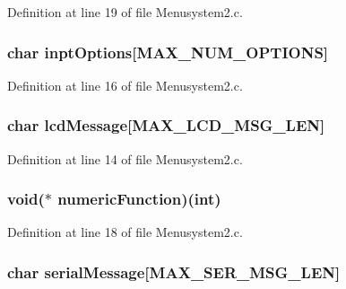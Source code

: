 Definition at line 19 of file Menusystem2.\+c.

\hypertarget{struct_sub_menu_aef0980fb751ef312c4ff945539aa3cd4}{
\subsubsection[{inpt\+Options}]{\setlength{\rightskip}{0pt plus 5cm}char inpt\+Options\mbox{[}{\bf M\+A\+X\+\_\+\+N\+U\+M\+\_\+\+O\+P\+T\+I\+O\+N\+S}\mbox{]}}}\label{struct_sub_menu_aef0980fb751ef312c4ff945539aa3cd4}


Definition at line 16 of file Menusystem2.\+c.

\hypertarget{struct_sub_menu_a10ce8be3d2bbadbc9c262b6be4bb3aec}{
\subsubsection[{lcd\+Message}]{\setlength{\rightskip}{0pt plus 5cm}char lcd\+Message\mbox{[}{\bf M\+A\+X\+\_\+\+L\+C\+D\+\_\+\+M\+S\+G\+\_\+\+L\+E\+N}\mbox{]}}}\label{struct_sub_menu_a10ce8be3d2bbadbc9c262b6be4bb3aec}


Definition at line 14 of file Menusystem2.\+c.

\hypertarget{struct_sub_menu_a1dae2f8dad8e2d2a30b13ee69ea542db}{
\subsubsection[{numeric\+Function}]{\setlength{\rightskip}{0pt plus 5cm}void($\ast$ numeric\+Function)(int)}}\label{struct_sub_menu_a1dae2f8dad8e2d2a30b13ee69ea542db}


Definition at line 18 of file Menusystem2.\+c.

\hypertarget{struct_sub_menu_a24706f7b55951b0e21967a256e107936}{
\subsubsection[{serial\+Message}]{\setlength{\rightskip}{0pt plus 5cm}char serial\+Message\mbox{[}{\bf M\+A\+X\+\_\+\+S\+E\+R\+\_\+\+M\+S\+G\+\_\+\+L\+E\+N}\mbox{]}}}\label{struct_sub_menu_a24706f7b55951b0e21967a256e107936}


